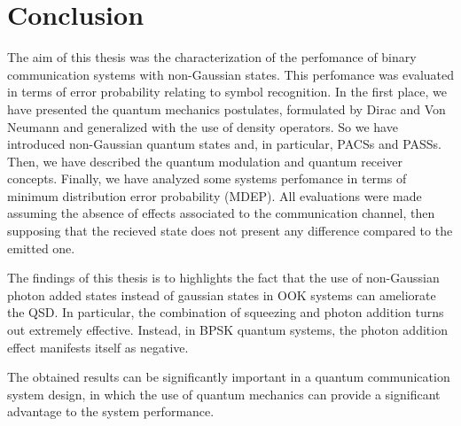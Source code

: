 
\chapter{Conclusion}
    The aim of this thesis was the characterization of the perfomance of binary communication systems with
    non-Gaussian states. This perfomance was evaluated in terms of error probability 
    relating to symbol recognition. 
    In the first place, we have presented the quantum mechanics postulates, formulated by Dirac and 
    Von Neumann and generalized with the use of density operators. So we have introduced non-Gaussian
    quantum states and, in particular, PACSs and PASSs.
    Then, we have described the quantum modulation and quantum receiver concepts. 
    Finally, we have analyzed some systems perfomance in terms of minimum distribution error 
    probability (MDEP).
    All evaluations were made assuming the absence of effects associated to the communication channel, 
    then supposing that the recieved state does not present any difference compared to the emitted one.
    
    The findings of this thesis is to highlights the fact that the use of non-Gaussian photon added states 
    instead of gaussian states in OOK systems can ameliorate the QSD.
    In particular, the combination of squeezing and photon addition turns out extremely effective.
    Instead, in BPSK quantum systems, the photon addition effect manifests itself as negative.

    The obtained results can be significantly important in a quantum communication system design, 
    in which the use of quantum mechanics can provide a significant advantage to the system performance. 
